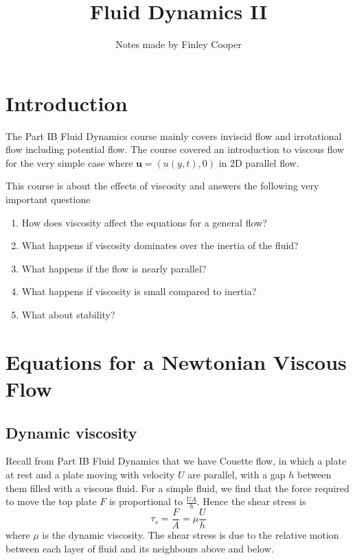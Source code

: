 \documentclass{article}
\title{Fluid Dynamics II}
\author{Notes made by Finley Cooper}
\begin{document}
  \maketitle
  \newpage
  \tableofcontents
  \newpage
\section{Introduction}
The Part IB Fluid Dynamics course mainly covers inviscid flow and irrotational flow including potential flow. The course covered an introduction to viscous flow for the very simple case where $ \mathbf u = (u(y,t), 0) $ in 2D parallel flow.
\par
This course is about the effects of viscosity and answers the following very important questione
\begin{enumerate}
	\item How does viscosity affect the equations for a general flow?
	\item What happens if viscosity dominates over the inertia of the fluid?
	\item What happens if the flow is nearly parallel?
	\item What happens if viscosity is small compared to inertia?
	\item What about stability?
\end{enumerate}
\section{Equations for a Newtonian Viscous Flow}
\subsection{Dynamic viscosity}
Recall from Part IB Fluid Dynamics that we have Couette flow, in which a plate at rest and a plate moving with velocity $ U $ are parallel, with a gap $ h $ between them filled with a viscous fluid. For a simple fluid, we find that the force required to move the top plate $ F $ is proportional to $ \frac {UA}h $. Hence the shear stress is
\[
  \tau_s = \frac FA = \mu\frac Uh
\]
where $ \mu $ is the dynamic viscosity. The shear stress is due to the relative motion between each layer of fluid and its neighbours above and below.
\end{document}
